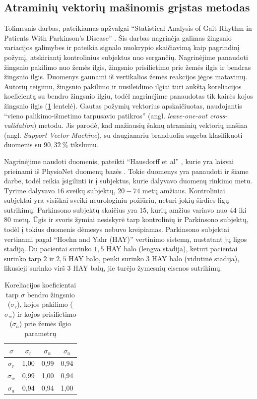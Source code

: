 \documentclass[]{vgtuef}
\begin{document}
\subsection{Atraminių vektorių mašinomis grįstas metodas}


Tolimesnis darbas, pateikiamas apžvalgai ``Statistical Analysis of Gait Rhythm in Patients With Parkinson's Disease'' \cite{5280353}. Šis darbas nagrinėja galimas žingsnio variacijos galimybes ir pateikia signalo nuokrypio skaičiavimą kaip pagrindinį požymį, atskiriantį kontrolinius subjektus nuo sergančių. Nagrinėjime panaudoti žingsnio pakilimo nuo žemės ilgis, žingsnio prisilietimo prie žemės ilgis ir bendras žingsnio ilgis. Duomenys gaunami iš vertikalios žemės reakcijos jėgos matavimų. Autorių teigimu, žingsnio pakilimo ir nusileidimo ilgiai turi aukštą koreliacijos koeficientą su bendro žingsnio ilgiu, todėl nagrinėjime panaudotas tik kairės kojos žingsnio ilgis (\ref{table:stance_swing_string_corr} lentelė). Gautas požymių vektorius apskaičiuotas, naudojantis ``vieno palikimo-išmetimo tarpusavio patikros'' (angl. \textit{leave-one-out cross-validation}) metodu. Jis parodė, kad mažiausių šaknų atraminių vektorių mašina (angl. \textit{Support Vector Machine}), su daugianariu branduoliu sugeba klasifikuoti duomenis su $90,32~\%$ tikslumu. 

Nagrinėjime naudoti duomenis, pateikti ``Hausdorff et al'' \cite{MDS:MDS870130310}, kurie yra laisvai prieinami iš PhysioNet duomenų bazės \cite{932728}. Tokie duomenys yra panaudoti ir šiame darbe, todėl reikia įsigilinti ir į subjektus, kurie dalyvavo duomenų rinkimo metu. Tyrime dalyvavo $16$ sveikų subjektų, $20-74$ metų amžiaus. Kontroliniai subjektai yra visiškai sveiki neurologiniu požiūriu, neturi jokių širdies ligų sutrikimų. Parkinsono subjektų skaičius yra $15$, kurių amžius variavo nuo $44$ iki $80$ metų. Ūgis ir svoris žymiai nesiskyrė tarp kontrolinių ir Parkinsono subjektų, todėl į tokius duomenis dėmesys nebuvo kreipiamas. Parkinsono subjektai vertinami pagal ``Hoehn and Yahr (HAY)'' vertinimo sistemą, nustatant jų ligos stadiją. Du pacientai surinko $1,5$ HAY balo (lengva stadija), keturi pacientai surinko tarp $2$ ir $2,5$ HAY balo, penki surinko $3$ HAY balo (vidutinė stadija), likusieji surinko virš $3$ HAY balų, jie turėjo žymesnių eisenos sutrikimų. 

\begin{table}[b]
  \centering
  \renewcommand{\arraystretch}{1.3}
  \caption{Koreliacijos koeficientai tarp $\sigma$ bendro žingsnio ($\sigma_r$), kojos pakilimo ($\sigma_w$) ir kojos prisilietimo ($\sigma_a$) prie žemės ilgio parametrų \cite{5280353}}
  \label{table:stance_swing_string_corr}
  \begin{tabular}{|c|c|c|c|} \hline
    $\sigma$ & $\sigma_r$ & $\sigma_w$ & $\sigma_a$ \\ \hline
    $\sigma_r$ & 1,00 & 0,99 & 0,94 \\ \hline
    $\sigma_w$ & 0,99 & 1,00 & 0,94 \\ \hline
    $\sigma_a$ & 0,94 & 0,94 & 1,00 \\ \hline
  \end{tabular}
\end{table}
\end{document}
